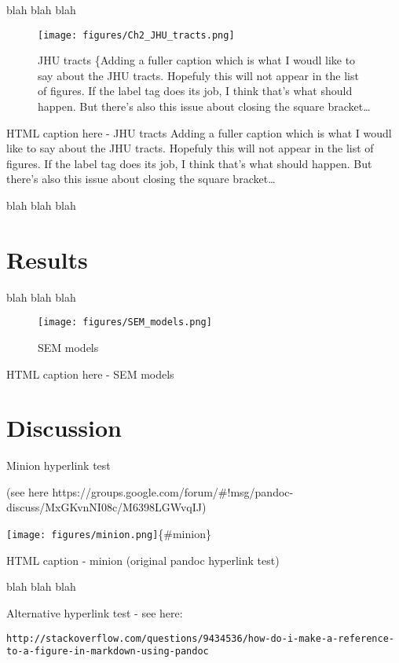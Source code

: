 \documentclass{report}
\begin{document}
    blah blah blah

    \begin{figure}[htbp]
\centering
\texttt{[image: figures/Ch2\_JHU\_tracts.png]}
\caption{JHU tracts \{Adding a fuller caption which is what I woudl like
to say about the JHU tracts. Hopefuly this will not appear in the list
of figures. If the label tag does its job, I think that's what should
happen. But there's also this issue about closing the square
bracket\ldots{} \label{fig:JHU tracts}}
\end{figure}

HTML caption here - JHU tracts Adding a fuller caption which is what I
woudl like to say about the JHU tracts. Hopefuly this will not appear in
the list of figures. If the label tag does its job, I think that's what
should happen. But there's also this issue about closing the square
bracket\ldots{}

    blah blah blah


    \section{Results}


    blah blah blah

    \begin{figure}[htbp]
\centering
\texttt{[image: figures/SEM\_models.png]}
\caption{SEM models \label{fig:SEM models}}
\end{figure}

HTML caption here - SEM models


    \section{Discussion}


    Minion hyperlink test

(see here
https://groups.google.com/forum/\#!msg/pandoc-discuss/MxGKvnNI08c/M6398LGWvqIJ)

    \texttt{[image: figures/minion.png]}\{\#minion\}

HTML caption - minion (original pandoc hyperlink test)

    blah blah blah

    Alternative hyperlink test - see here:

\begin{verbatim}
http://stackoverflow.com/questions/9434536/how-do-i-make-a-reference-to-a-figure-in-markdown-using-pandoc
\end{verbatim}
\end{document}
